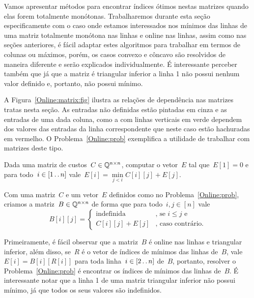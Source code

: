 Vamos apresentar métodos para encontrar índices ótimos nestas matrizes quando elas forem totalmente monótonas. Trabalharemos durante esta seção especificamente com o caso onde estamos interessados nos mínimos das linhas de uma matriz totalmente monótona nas linhas e online nas linhas, assim como nas seções anteriores, é fácil adaptar estes algoritmos para trabalhar em termos de colunas ou máximos, porém, os casos convexo e côncavo são resolvidos de maneira diferente e serão explicados individualmente. É interessante perceber também que já que a matriz é triangular inferior a linha 1 não possui nenhum valor definido e, portanto, não possui mínimo. 

A Figura~\ref{Online:matrix:fig} ilustra as relações de dependência nas matrizes tratas nesta seção. As entradas não definidas estão pintadas em cinza e as entradas de uma dada coluna, como a com linhas verticais em verde dependem dos valores das entradas da linha correspondente que neste caso estão hachuradas em vermelho. O Problema~\ref{Online:prob} exemplifica a utilidade de trabalhar com matrizes deste tipo.

\begin{prob} \label{Online:prob}
Dada uma matriz de custos~$C \in \mathbb{Q}^{n \times n}$, computar o vetor~$E$ tal que~$E[1] = 0$ e para todo~$i \in [1 \,.\,.\, n]$ vale~$E[i] = \min\limits_{j < i} C[i][j] + E[j]$.
\end{prob}

Com uma matriz~$C$ e um vetor~$E$ definidos como no Problema~\ref{Online:prob}, criamos a matriz~$B \in \mathbb{Q}^{n \times n}$ de forma que para todo~$i,j \in [n]$ vale
\begin{equation} \label{Online:Bmat}
    B[i][j] = \begin{cases}
        \text{indefinida} & \text{, se } i \leq j \text{ e } \\
        C[i][j] + E[j]    & \text{, caso contrário.}
    \end{cases}
\end{equation}

Primeiramente, é fácil observar que a matriz~$B$ é online nas linhas e triangular inferior, além disso, se~$R$ é o vetor de índices de mínimos das linhas de~$B$, vale~$E[i] = B[i][R[i]]$ para toda linha~$i \in [2 \,.\,.\, n]$ de~$B$, portanto, resolver o Problema~\ref{Online:prob} é encontrar os índices de mínimos das linhas de~$B$. É interessante notar que a linha 1 de uma matriz triangular inferior não possui mínimo, já que todos os seus valores são indefinidos.

